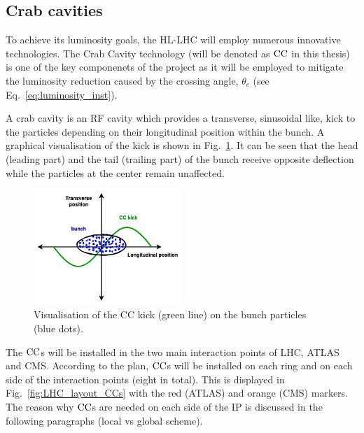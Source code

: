 

\subsection{Crab cavities}\label{subsec:CC_intro}
To achieve its luminosity goals, the HL-LHC will employ numerous innovative technologies. The Crab Cavity technology (will be denoted as ${\mathrm{CC}}$ in this thesis)~\cite{Calaga:2673544} is one of the key componenets of the project as it will be employed to mitigate the luminosity reduction caused by the crossing angle, $\theta_c$ (see Eq.~\eqref{eq:luminosity_inst}).

A crab cavity is an RF cavity which provides a transverse, sinusoidal like, kick to the particles depending on their longitudinal position within the bunch. A graphical visualisation of the kick is shown in Fig.~\ref{fig:cc_simple_kick}. It can be seen that the head (leading part) and the tail (trailing part) of the bunch receive opposite deflection while the particles at the center remain unaffected.

\begin{figure}[!h] %
    \centering         
    \includegraphics[width=0.5\textwidth]{images/introduction/sin_CC_kick_LHC_beams.drawio.png}
        \caption{Visualisation of the CC kick (green line) on the bunch particles (blue dots).} %
        \label{fig:cc_simple_kick}
 \end{figure}

The ${\mathrm{CC}}$s will be installed in the two main interaction points of LHC, ATLAS and CMS. According to the plan, ${\mathrm{CC}}$s will be installed on each ring and on each side of the interaction points (eight in total). This is displayed in Fig.~\ref{fig:LHC_layout_CCs} with the red (ATLAS) and orange (CMS) markers. The reason why ${\mathrm{CC}}$s are needed on each side of the IP is discussed in the following paragraphs (local vs global scheme).

